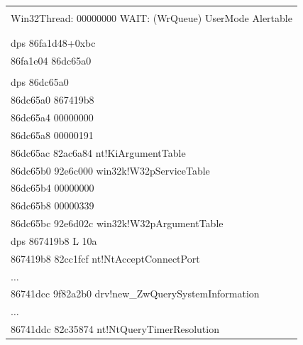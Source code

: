 \begin{table}
\begin{center}
\begin{tabular}{|l|}
    \hspace*{10mm}{\sf THREAD 86d4bd48  Cid 0fb8.0fd8  Teb: 7ffd9000}\\


{\sf Win32Thread: 00000000 WAIT: (WrQueue) UserMode Alertable}\\


    \hspace*{15mm}{\sf 86792200  QueueObject}\\


              \\


{\sf dps 86fa1d48+0xbc}\\


{\sf 86fa1e04  86dc65a0}\\


\\


{\sf dps 86dc65a0}\\


{\sf 86dc65a0  867419b8}\\


{\sf 86dc65a4  00000000}\\


{\sf 86dc65a8  00000191}\\


{\sf 86dc65ac  82ac6a84 nt!KiArgumentTable}\\


{\sf 86dc65b0  92e6c000 win32k!W32pServiceTable}\\


{\sf 86dc65b4  00000000}\\


{\sf 86dc65b8  00000339}\\


{\sf 86dc65bc  92e6d02c win32k!W32pArgumentTable}\\


{\sf dps 867419b8 L 10a}\\


{\sf 867419b8  82cc1fcf nt!NtAcceptConnectPort}\\


$\ldots$\\


{\sf 86741dcc  9f82a2b0 drv!new\_ZwQuerySystemInformation} \\


$\ldots$\\


{\sf 86741ddc  82c35874  nt!NtQueryTimerResolution}\\



\end{tabular}
\end{center}
\end{table}
